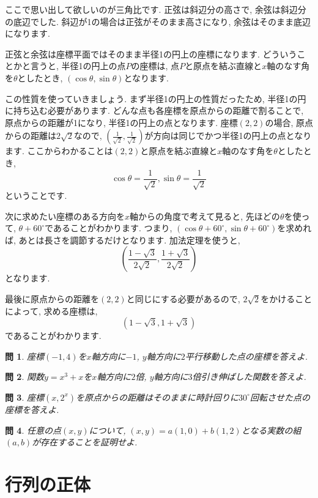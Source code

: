 \documentclass[a4paper,12pt]{jreport}
\newtheorem{problem}{問}[chapter]
\theoremstyle{definition}
\newcommand{\ang}[1]{#1^\circ}
\begin{document}
   ここで思い出して欲しいのが三角比です.
   正弦は斜辺分の高さで,
   余弦は斜辺分の底辺でした.
   斜辺が1の場合は正弦がそのまま高さになり,
   余弦はそのまま底辺になります.

   正弦と余弦は座標平面ではそのまま半径1の円上の座標になります.
   どういうことかと言うと,
   半径1の円上の点$P$の座標は,
   点$P$と原点を結ぶ直線と$x$軸のなす角を$\theta$としたとき,
   $(\cos{\theta}, \sin{\theta})$となります.

   この性質を使っていきましょう.
   まず半径1の円上の性質だったため,
   半径1の円に持ち込む必要があります.
   どんな点も各座標を原点からの距離で割ることで,
   原点からの距離が1になり,
   半径1の円上の点となります.
   座標$(2,2)$の場合,
   原点からの距離は$2\sqrt{2}$なので,
   $(\frac{1}{\sqrt{2}},\frac{1}{\sqrt{2}})$が方向は同じでかつ半径1の円上の点となります.
   ここからわかることは$(2,2)$と原点を結ぶ直線と$x$軸のなす角を$\theta$としたとき,
   $$\cos{\theta}=\frac{1}{\sqrt{2}}, \sin\theta=\frac{1}{\sqrt{2}}$$
   ということです.

   次に求めたい座標のある方向を$x$軸からの角度で考えて見ると,
   先ほどの$\theta$を使って,
   $\theta+\ang{60}$であることがわかります.
   つまり,
   $(\cos\theta+\ang{60},\sin\theta+\ang{60})$を求めれば,
   あとは長さを調節するだけとなります.
   加法定理を使うと,
   $$\left(\frac{1-\sqrt{3}}{2\sqrt{2}},\frac{1+\sqrt{3}}{2\sqrt{2}}\right)$$
   となります.
   
   最後に原点からの距離を$(2,2)$と同じにする必要があるので,
   $2\sqrt{2}$をかけることによって,
   求める座標は,
   $$\left(1-\sqrt{3},1+\sqrt{3}\right)$$
   であることがわかります.

   \begin{problem}
      座標$(-1,4)$を$x$軸方向に$-1$, $y$軸方向に$2$平行移動した点の座標を答えよ.
   \end{problem}
   \begin{problem}
      関数$y=x^3+x$を$x$軸方向に$2$倍, $y$軸方向に$3$倍引き伸ばした関数を答えよ.
   \end{problem}
   \begin{problem}
      座標$(x,2^x)$を原点からの距離はそのままに時計回りに$\ang{30}$回転させた点の座標を答えよ.
   \end{problem}
   \begin{problem}
      任意の点$(x,y)$について, $(x,y)=a(1,0)+b(1,2)$となる実数の組$(a,b)$が存在することを証明せよ.
   \end{problem}

   \newpage

   \section{行列の正体}\label{sense}
\end{document}
